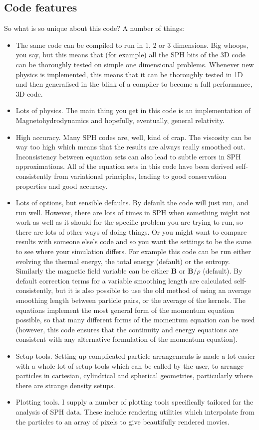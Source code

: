 \documentclass[a4paper,12pt]{article}
\begin{document}
\subsection{Code features}
 So what is so unique about this code? A number of things:
\begin{itemize}
\item The same code can be compiled to run in 1, 2 or 3 dimensions. Big whoops,
you say, but this means that (for example) all the SPH bits of the 3D code can be thoroughly tested
on simple one dimensional problems. Whenever new physics is implemented, this
means that it can be thoroughly tested in 1D and then generalised in the blink
of a compiler to become a full performance, 3D code.
\item Lots of physics. The main thing you get in this code is an implementation
of Magnetohydrodynamics and hopefully, eventually, general relativity.
\item High accuracy. Many SPH codes are, well, kind of crap. The viscosity can
be way too high which means that the results are always really smoothed out.
Inconsistency between equation sets can also lead to subtle errors in SPH
approximations. All of the equation sets in this code have been derived
self-consistently from variational principles, leading to good conservation
properties and good accuracy.
\item Lots of options, but sensible defaults. By default the code will just run,
and run well. However, there are lots of times in SPH when something might not
work as well as it should for the specific problem you are trying to run, so
there are lots of other ways of doing things. Or you might want to compare
results with someone else's code and so you want the settings to be the same to
see where your simulation differs. For example this code can be run either
evolving the thermal energy, the total energy (default) or the entropy.
Similarly the magnetic field variable can be either $\mathbf{B}$ or
$\mathbf{B}/\rho$ (default). By default correction terms for a variable smoothing length
are calculated self-consistently, but it is also possible to use the old method
of using an average smoothing length between particle pairs, or the average of
the kernels. The equations implement the most general form of the momentum
equation possible, so that many different forms of the momentum equation can be
used (however, this code ensures that the continuity and energy equations are
consistent with any alternative formulation of the momentum equation). 
\item Setup tools. Setting up complicated particle arrangements is made a lot
easier with a whole lot of setup tools which can be called by the user, to
arrange particles in cartesian, cylindrical and spherical geometries,
particularly where there are strange density setups.
\item Plotting tools. I supply a number of plotting tools specifically tailored
for the analysis of SPH data. These include rendering utilities which
interpolate from the particles to an array of pixels to give beautifully
rendered movies.
\end{itemize}
\end{document}
